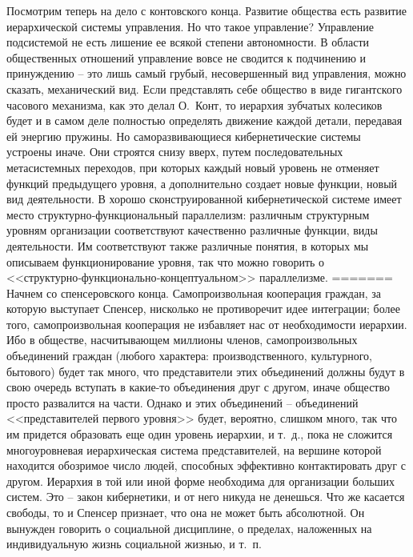 \documentclass{book}
\begin{document}
Посмотрим теперь на дело с контовского конца. Развитие общества есть развитие иерархической системы управления. Но что такое управление? Управление подсистемой не есть лишение ее всякой степени автономности. В области общест­венных отношений управление вовсе не сводится к подчинению и принуждению -- это лишь самый грубый, несовершенный вид управления, можно сказать, механический вид.  Если представ­лять себе общество в виде гигантского часового механизма, как это делал О.~Конт, то иерархия зубчатых колесиков будет и в самом деле полностью определять движение каждой детали, передавая ей энергию пружины. Но саморазвивающиеся ки­бернетические системы устроены иначе. Они строятся снизу вверх, путем последовательных метасистемных переходов, при которых каждый новый уровень не отменяет функций пре­дыдущего уровня, а дополнительно создает новые функции, новый вид деятельности. В хорошо сконструированной кибер­нетической системе имеет место структурно‑функциональный параллелизм:  различным структурным уровням организации соответствуют качественно различные функции, виды деятель­ности. Им соответствуют также различные понятия, в которых мы описываем функционирование уровня, так что можно гово­рить о <<структурно‑функционально‑концептуальном>> паралле­лизме.
=======
Начнем со спенсеровского конца. Самопроизвольная коопе­рация граждан, за которую выступает Спенсер, нисколько не противоречит идее интеграции; более того, самопроизвольная кооперация не избавляет нас от необходимости  иерархии. Ибо в обществе, насчитывающем миллионы членов, самопроизволь­ных объединений граждан (любого характера: производствен­ного, культурного, бытового) будет так много, что предста­вители этих объединений должны будут в свою очередь всту­пать в какие-то объединения друг с другом, иначе общество просто развалится на части. Однако и этих объединений -- объе­динений <<представителей первого уровня>> будет, вероятно, слишком много, так что им придется образовать еще один уро­вень иерархии, и т.~д., пока не сложится многоуровневая иерар­хическая система представителей, на вершине которой находит­ся обозримое число людей, способных эффективно контакти­ровать друг с другом. Иерархия в той или иной форме необ­ходима для организации больших систем. Это -- закон кибер­нетики, и от него никуда не 
денешься. Что же касается свободы, то и Спенсер признает, что она не может быть абсолютной. Он вынужден говорить о социальной дисциплине, о пределах, наложенных на индивидуальную жизнь социальной жизнью, и т.~п.
\end{document}
